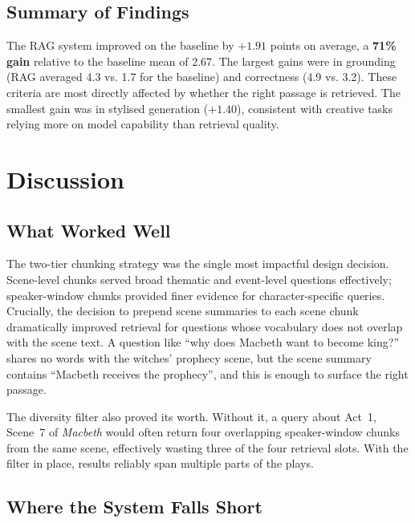 \documentclass[10pt,conference]{IEEEtran}
\begin{document}
\subsection{Summary of Findings}

\vspace{4pt}
\begin{mdframed}[style=finding]
\small\noindent The RAG system improved on the baseline by
$+\mathbf{1.91}$ points on average, a \textbf{71\% gain} relative to
the baseline mean of 2.67. The largest gains were in grounding
(RAG averaged 4.3 vs. 1.7 for the baseline) and correctness (4.9
vs. 3.2). These criteria are most directly affected by whether the
right passage is retrieved. The smallest gain was in stylised
generation ($+1.40$), consistent with creative tasks relying more on
model capability than retrieval quality.
\end{mdframed}

\section{Discussion}
\label{sec:discussion}

\subsection{What Worked Well}

The two-tier chunking strategy was the single most impactful design
decision. Scene-level chunks served broad thematic and event-level
questions effectively; speaker-window chunks provided finer evidence
for character-specific queries. Crucially, the decision to prepend
scene summaries to each scene chunk dramatically improved retrieval
for questions whose vocabulary does not overlap with the scene text.
A question like ``why does Macbeth want to become king?'' shares no
words with the witches' prophecy scene, but the scene summary
contains ``Macbeth receives the prophecy'', and this is enough to
surface the right passage.

The diversity filter also proved its worth. Without it, a query about
Act~1, Scene~7 of \textit{Macbeth} would often return four overlapping
speaker-window chunks from the same scene, effectively wasting three
of the four retrieval slots. With the filter in place, results reliably
span multiple parts of the plays.

\subsection{Where the System Falls Short}
\end{document}

